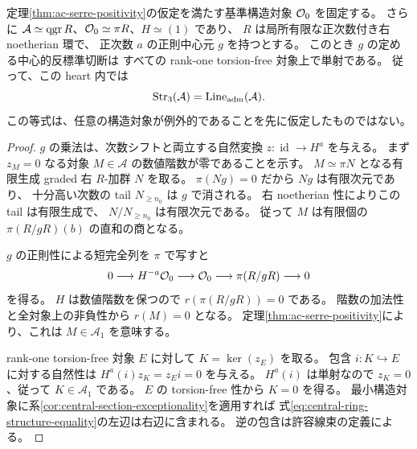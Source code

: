 \begin{proposition}[正則中心元を持つ反標準表示への適用]
\label{prop:central-ring-all-structures-exceptional}
定理\ref{thm:ac-serre-positivity}の仮定を満たす基準構造対象 $\mathcal O_0$ を固定する。
さらに $\mathcal A\simeq\operatorname{qgr} R$、$\mathcal O_0\simeq\pi R$、$H\simeq(1)$ であり、
$R$ は局所有限な正次数付き右 noetherian 環で、
正次数 $a$ の正則中心元 $g$ を持つとする。
このとき $g$ の定める中心的反標準切断は
すべての rank-one torsion-free 対象上で単射である。
従って、この heart 内では
\begin{equation}\label{eq:central-ring-structure-equality}
 \operatorname{Str}_3(\mathcal A)
 =\operatorname{Line}_{\rm adm}(\mathcal A).
\end{equation}
この等式は、任意の構造対象が例外的であることを先に仮定したものではない。
\end{proposition}
\begin{proof}
$g$ の乗法は、次数シフトと両立する自然変換
$z:\operatorname{id}\to H^a$ を与える。
まず $z_M=0$ なる対象 $M\in\mathcal A$ の数値階数が零であることを示す。
$M\simeq\pi N$ となる有限生成 graded 右 $R$-加群 $N$ を取る。
$\pi(Ng)=0$ だから $Ng$ は有限次元であり、
十分高い次数の tail $N_{\ge n_0}$ は $g$ で消される。
右 noetherian 性によりこの tail は有限生成で、
$N/N_{\ge n_0}$ は有限次元である。
従って $M$ は有限個の $\pi(R/gR)(b)$ の直和の商となる。

$g$ の正則性による短完全列を $\pi$ で写すと
\[
 0\longrightarrow H^{-a}\mathcal O_0\longrightarrow\mathcal O_0
 \longrightarrow\pi(R/gR)\longrightarrow0
\]
を得る。
$H$ は数値階数を保つので $r(\pi(R/gR))=0$ である。
階数の加法性と全対象上の非負性から $r(M)=0$ となる。
定理\ref{thm:ac-serre-positivity}により、これは $M\in\mathcal A_1$ を意味する。

rank-one torsion-free 対象 $E$ に対して $K=\ker(z_E)$ を取る。
包含 $i:K\hookrightarrow E$ に対する自然性は
$H^a(i)z_K=z_Ei=0$ を与える。
$H^a(i)$ は単射なので $z_K=0$、従って $K\in\mathcal A_1$ である。
$E$ の torsion-free 性から $K=0$ を得る。
最小構造対象に系\ref{cor:central-section-exceptionality}を適用すれば
式\eqref{eq:central-ring-structure-equality}の左辺は右辺に含まれる。
逆の包含は許容線束の定義による。
\end{proof}

